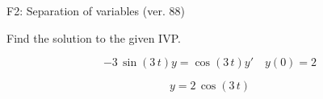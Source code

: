 \begin{exercise}
  \begin{exerciseTitle}F2: Separation of variables (ver. 88)\end{exerciseTitle}
  \begin{exerciseStatement}
    
Find the solution to the given IVP.

    
\[-3 \, \sin\left(3 \, t\right) y= \cos\left(3 \, t\right) y'\hspace{1em} y\left( 0 \right)= 2\]

  \end{exerciseStatement}
  \begin{exerciseAnswer}
    
\[y= 2 \, \cos\left(3 \, t\right)\]

  \end{exerciseAnswer}
\end{exercise}